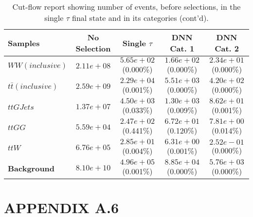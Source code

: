 \begin{landscape}
\begin{table}
\centering
\caption{Cut-flow report showing number of events, before selections, in the single $\tau$ final state and in its categories (cont'd).}
\begin{tabular}{ |l|c|c|c|c| }
    \hline
    Samples                                & No Selection                   & Single $\tau$        & DNN Cat. 1        & DNN Cat. 2       \\
    \hline
    $WW(inclusive)$ &  $2.11e+08$  &   $5.65e+02$ (0.000\%) &  $1.66e+02$ (0.000\%) &  $2.34e+01$ (0.000\%) \\
                    $t\bar{t} (inclusive)$ &  $2.59e+09$  &   $2.29e+04$ (0.001\%) &  $5.51e+03$ (0.000\%) &  $4.20e+02$ (0.000\%) \\
                                 $ttGJets$ &  $1.37e+07$  &   $4.50e+03$ (0.033\%) &  $1.30e+03$ (0.009\%) &  $8.62e+01$ (0.001\%) \\
                                    $ttGG$ &  $5.59e+04$  &   $2.47e+02$ (0.441\%) &  $6.72e+01$ (0.120\%) &  $7.81e+00$ (0.014\%) \\
                                     $ttW$ &  $6.76e+05$  &   $2.85e+01$ (0.004\%) &  $6.31e+00$ (0.001\%) &  $2.52e-01$ (0.000\%) \\
                       \textbf{Background} &  $8.10e+10$  &   $4.96e+05$ (0.001\%) &  $8.85e+04$ (0.000\%) &  $5.76e+03$ (0.000\%) \\
    \hline
\end{tabular}
\end{table}
\end{landscape}
\newpage


\section*{APPENDIX A.6}\label{App6}

